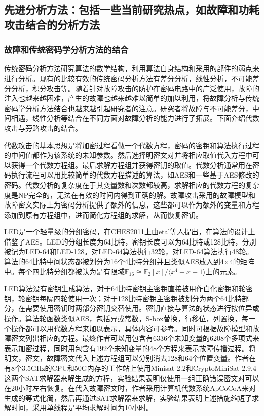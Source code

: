 \documentclass[a4paper,12pt]{article}
\begin{document}
\begin{CJK}{UTF8}{gkai}
\subsection{先进分析方法：包括一些当前研究热点，如故障和功耗攻击结合的分析方法}
\subsubsection{故障和传统密码学分析方法的结合}

传统密码分析方法研究算法的数学结构，利用算法自身结构和采用的部件的弱点来进行分析。现有的比较有效的传统密码分析方法有差分分析，线性分析，不可能差分分析，积分攻击等。随着针对故障攻击的防护在密码电路中的广泛使用，故障的注入也越来越困难，产生的故障也越来越难以简单的加以利用，将故障分析与传统密码学分析方法结合也越来越引起研究者的注意。研究者将故障与不可能差分，中间相遇，线性分析等结合在不同方面对故障分析的能力进行了拓展。下面介绍代数攻击与旁路攻击的结合。

代数攻击的基本思想是将加密过程看做一个代数方程，密码的密钥和算法执行过程的中间值都作为该系统的未知参数。然后选择明密文对并将相应取值代入方程中可以获得一个代数方程组。最后求解方程组并获得密钥的取值。代数分析通常用在密码执行流程可以用比较简单的代数方程描述的算法，如AES和一些基于AES修改的密码。代数分析的复杂度在于其变量数和次数都较高，求解相应的代数方程的复杂度是NP完全的，无法在有效的时间内得到正确的解。故障攻击采用的故障模型和故障密文实际上为密码分析提供了额外的信息，这些都可以作为额外的变量和方程添加到原有方程组中，进而简化方程组的求解，从而恢复密钥。

LED是一个轻量级的分组密码，在CHES2011上由etal等人提出，在算法的设计上借鉴了AES。LED的分组长度为64比特，密钥长度可以为64比特或128比特，分别被记为LED-64和LED-128。对LED-64算法执行32轮，对LED-64算法执行48轮。算法的64比特中间状态都被划分为16个4比特分组并且类似AES放入到4$\times$4的矩阵中。每个四比特分组都被认为是有限域$\mathbb{F}_{16}\cong \mathbb{F}_{2}[x]/\langle x^{4}+x+1 \rangle$上的元素。

LED算法没有密钥生成算法，对于64比特密钥主密钥直接被用作白化密钥和轮密钥，轮密钥每隔四轮使用一次；对于128比特密钥主密钥被划分为两个64比特部分，在需要使用密钥时两部分密钥交替使用。密钥直接与算法的状态进行按位异或操作。算法轮函数类似AES，包括异或常数，S-box替换，行移位，列置换，每一个操作都可以用代数方程来加以表示，具体内容可参考。同时可根据故障模型和故障密文列出相应的方程。最终作者可以用包含有6336个未知变量的6208个多项式来表示加密过程，同时用包含有192个未知变量的48个方程来表示故障传播过程。将明文，密文，故障密文代入上述方程组可以分别消去128和64个位置变量。作者在有8个3.5GHz的CPU和50G内存的工作站上使用Minisat 2.2和CryptoMiniSat 2.9.4这两个SAT求解器来解生成的方程，实验结果表明仅使用一组正确错误密文对可以在20小时左右恢复。在代入故障密文时，作者采用计算机代数系统ApCoCoA来对生成的等式化简，然后再通过SAT求解器来求解，实验结果表明上述措施缩短了求解时间，采用单线程是平均求解时间为10小时。


\end{CJK}
\end{document}
